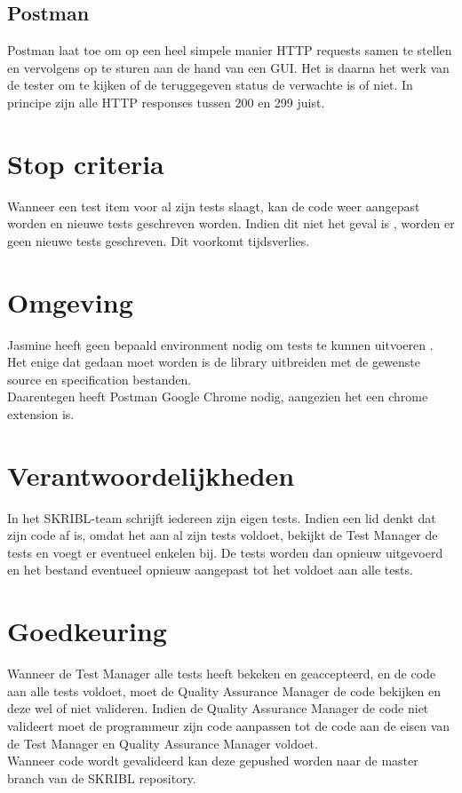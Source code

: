 \documentclass{article}
\begin{document}
\subsection{Postman}
Postman laat toe om op een heel simpele manier HTTP requests samen te stellen en vervolgens op te sturen aan de hand van een GUI. Het is daarna het werk van de tester om te kijken of de teruggegeven status de verwachte is of niet. In principe zijn alle HTTP responses tussen 200 en 299 juist.


\section{Stop criteria}
Wanneer een test item voor al zijn tests slaagt, kan de code weer aangepast worden en nieuwe tests geschreven worden. Indien dit niet het geval is , worden er geen nieuwe tests geschreven. Dit voorkomt tijdsverlies.

\section{Omgeving}
Jasmine heeft geen bepaald environment nodig om tests te kunnen uitvoeren . Het enige dat gedaan moet worden is de library uitbreiden met de gewenste source en specification bestanden.
\\
Daarentegen heeft Postman Google Chrome nodig, aangezien het een chrome extension is. 

\section{Verantwoordelijkheden}
In het SKRIBL-team schrijft iedereen zijn eigen tests. Indien een lid denkt dat zijn code af is, omdat het aan al zijn tests voldoet, bekijkt de Test Manager de tests en voegt er eventueel enkelen bij. De tests worden dan opnieuw uitgevoerd en het bestand eventueel opnieuw aangepast tot het voldoet aan alle tests. 

\section{Goedkeuring}
Wanneer de Test Manager alle tests heeft bekeken en geaccepteerd, en de code aan alle tests voldoet, moet de Quality Assurance Manager de code bekijken en deze wel of niet valideren.  Indien de Quality Assurance Manager de code niet valideert moet de programmeur zijn code aanpassen tot de code aan de eisen van de Test Manager en Quality Assurance Manager voldoet.
\\
Wanneer code wordt gevalideerd kan deze gepushed worden naar de master branch van de SKRIBL repository.


\clearpage
\end{document}

